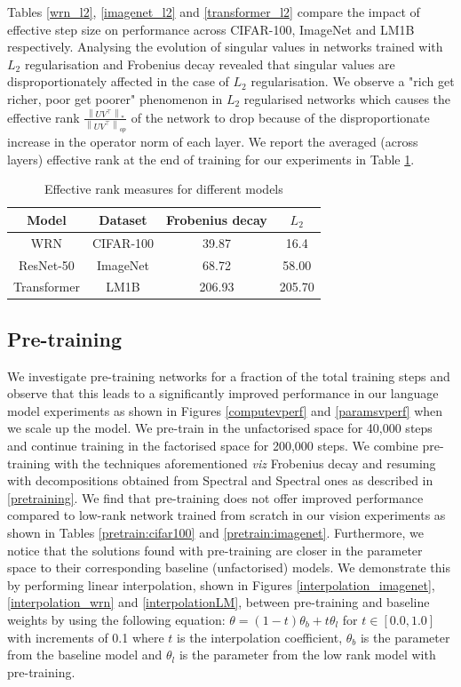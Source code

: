 \documentclass{article}
\newcommand{\norm}[2]{\left\lVert #1 \right\rVert_{#2}}
\begin{document}
Tables \ref{wrn_l2}, \ref{imagenet_l2} and \ref{transformer_l2} compare the impact of effective step size on performance across CIFAR-100, ImageNet and LM1B respectively. Analysing the evolution of singular values in networks trained with $L_2$ regularisation and Frobenius decay revealed that singular values are disproportionately affected in the case of $L_2$ regularisation. We observe a "rich get richer, poor get poorer" phenomenon in $L_2$ regularised networks which causes the effective rank $\frac{\norm{UV^\top}{*}}{\norm{UV^\top}{op}}$ of the network to drop because of the disproportionate increase in the operator norm of each layer. We report the averaged (across layers) effective rank at the end of training for our experiments in Table \ref{erank_table}.
\begin{table}[H]
    \centering
    \begin{tabular}{|c|c|c|c|}
    \hline
         Model& Dataset& Frobenius decay & $L_2$   \\ \hline
         WRN& CIFAR-100& 39.87 & 16.4\\ \hline
         ResNet-50 & ImageNet & 68.72 & 58.00 \\ \hline
         Transformer & LM1B & 206.93 & 205.70\\ \hline
    \end{tabular}
    \caption{Effective rank measures for different models}
    \label{erank_table}
\end{table}

\subsection{Pre-training} \label{expt:pretrain}

We investigate pre-training networks for a fraction of the total training steps and observe that this leads to a significantly improved performance in our language model experiments as shown in Figures \ref{computevperf} and \ref{paramsvperf} when we scale up the model. We pre-train in the unfactorised space for 40,000 steps and continue training in the factorised space for 200,000 steps. We combine pre-training with the techniques aforementioned \textit{viz} Frobenius decay and resuming with decompositions obtained from Spectral and Spectral ones as described in \ref{pretraining}. We find that pre-training does not offer improved performance compared to low-rank network trained from scratch in our vision experiments as shown in Tables \ref{pretrain:cifar100} and \ref{pretrain:imagenet}. Furthermore, we notice that the solutions found with pre-training are closer in the parameter space to their corresponding baseline (unfactorised) models. We demonstrate this by performing linear interpolation, shown in Figures \ref{interpolation_imagenet}, \ref{interpolation_wrn} and \ref{interpolationLM}, between pre-training and baseline weights by using the following equation:
$\theta = (1-t) \theta_b +t\theta_l$ for $t \in [0.0, 1.0]$ with increments of 0.1 where $t$ is the interpolation coefficient, $\theta_b$ is the parameter from the baseline model and $\theta_l$ is the parameter from the low rank model with pre-training.
\end{document}
